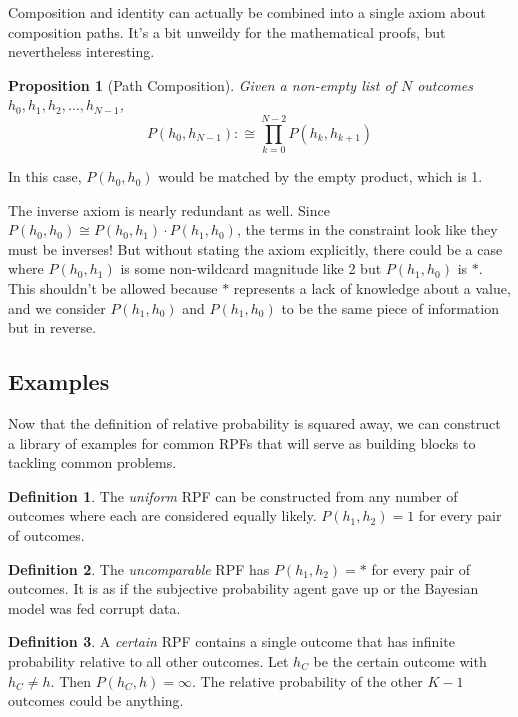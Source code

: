 \documentclass[twoside]{article}
\theoremstyle{plain}%
\newtheorem{proposition}[theorem]{Proposition}
\theoremstyle{definition}
\newtheorem{definition}{Definition}[section]
\theoremstyle{remark}
\begin{document}
Composition and identity can actually be combined into a single axiom about composition paths. It's a bit unweildy for the mathematical proofs, but nevertheless interesting.

\begin{proposition}[Path Composition]
Given a non-empty list of \(N\) outcomes \(h_0, h_1, h_2, ..., h_{N-1}\), \[P(h_0, h_{N-1}) :\cong \prod_{k=0}^{N-2} P(h_k, h_{k+1}) \]
\end{proposition}

In this case, \(P(h_0, h_0)\) would be matched by the empty product, which is 1.

The inverse axiom is nearly redundant as well. Since \(P(h_0, h_0) \cong P(h_0, h_1) \cdot P(h_1, h_0)\), the terms in the constraint look like they must be inverses! But without stating the axiom explicitly, there could be a case where \(P(h_0, h_1)\) is some non-wildcard magnitude like 2 but \(P(h_1, h_0)\) is \(\ast\). This shouldn't be allowed because \(\ast\) represents a lack of knowledge about a value, and we consider \(P(h_1, h_0)\) and \(P(h_1, h_0)\) to be the same piece of information but in reverse.

\subsection{Examples}

Now that the definition of relative probability is squared away, we can construct a library of examples for common RPFs that will serve as building blocks to tackling common problems.

\begin{definition}
\label{def:uniform_rpf}
The \textit{uniform} RPF can be constructed from any number of outcomes where each are considered equally likely. \(P(h_1, h_2) = 1\) for every pair of outcomes.
\end{definition}

\begin{definition}
\label{def:uncomparable_rpf}
The \textit{uncomparable} RPF has \(P(h_1, h_2) = \ast\) for every pair of outcomes. It is as if the subjective probability agent gave up or the Bayesian model was fed corrupt data.
\end{definition}

\begin{definition}
A \textit{certain} RPF contains a single outcome that has infinite probability relative to all other outcomes. Let \(h_C\) be the certain outcome with \(h_C \neq h\). Then \(P(h_C, h) = \infty\). The relative probability of the other \(K-1\) outcomes could be anything.
\end{definition}
\end{document}
